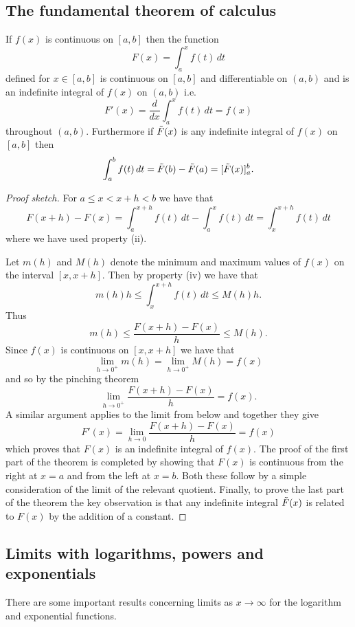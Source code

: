 \documentclass[10pt, a4paper]{article}
\begin{document}
\subsection{The fundamental theorem of calculus}
\begin{theorem}
    If $f(x)$ is continuous on $[a, b]$ then the function
    \[
    F(x) = \int_{a}^{x}f(t)\,dt
    \]
    defined for $x \in [a, b]$ is continuous on $[a, b]$ and differentiable on $(a, b)$ and is an indefinite integral of $f(x)$ on $(a, b)$ i.e.
    \[
    F'(x) = \frac{d}{dx}\int_{a}^{x}f(t)\,dt = f(x)
    \]
    throughout $(a, b)$.
    Furthermore if $\Tilde{F}(x)$ is any indefinite integral of $f(x)$ on $[a, b]$ then
    \[
    \int_{a}^{b}f(t)\,dt = \Tilde{F}(b) - \Tilde{F}(a) = [\Tilde{F}(x)]^{b}_{a}.
    \]
    \begin{proof}[Proof sketch]\renewcommand{\qedsymbol}{$\triangle$}
    For $a \leq x < x + h < b$ we have that
    \[
    F(x + h) - F(x) = \int_{a}^{x + h}f(t)\,dt - \int_{a}^{x}f(t)\,dt = \int_{x}^{x + h}f(t)\,dt
    \]
    where we have used property (ii).
    
    Let $m(h)$ and $M(h)$ denote the minimum and maximum values of $f(x)$ on the interval $[x, x + h]$.
    Then by property (iv) we have that
    \[
    m(h)h \leq \int_{x}^{x + h}f(t)\,dt \leq M(h)h.
    \]
    Thus
    \[
    m(h) \leq \frac{F(x + h) - F(x)}{h} \leq M(h).
    \]
    Since $f(x)$ is continuous on $[x, x + h]$ we have that
    \[
    \lim_{h \rightarrow 0^+}m(h) = \lim_{h \rightarrow 0^+}M(h) = f(x)
    \]
    and so by the pinching theorem
    \[
    \lim_{h \rightarrow 0^+}\frac{F(x + h) - F(x)}{h} = f(x).
    \]
    A similar argument applies to the limit from below and together they give
    \[
    F'(x) = \lim_{h \rightarrow 0}\frac{F(x + h) - F(x)}{h} = f(x)
    \]
    which proves that $F(x)$ is an indefinite integral of $f(x)$.
    The proof of the first part of the theorem is completed by showing that $F(x)$ is continuous from the right at $x = a$ and from the left at $x = b$.
    Both these follow by a simple consideration of the limit of the relevant quotient.
    Finally, to prove the last part of the theorem the key observation is that any indefinite integral $\Tilde{F}(x)$ is related to $F(x)$ by the addition of a constant.
    \end{proof}
\end{theorem}

\subsection{Limits with logarithms, powers and exponentials}
There are some important results concerning limits as $x \rightarrow \infty$ for the logarithm and exponential functions.
\end{document}
